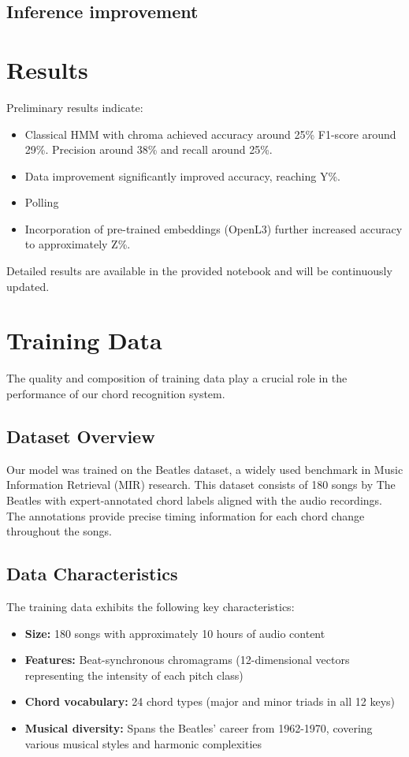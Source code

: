 \documentclass{article}
\begin{document}
\subsection{Inference improvement}


\section{Results}
Preliminary results indicate:
\begin{itemize}
    \item Classical HMM with chroma achieved accuracy around 25\% F1-score around 29\%. Precision around 38\% and recall around 25\%.
    \item Data improvement significantly improved accuracy, reaching Y\%.
    \item Polling
    \item Incorporation of pre-trained embeddings (OpenL3) further increased accuracy to approximately Z\%.
\end{itemize}
Detailed results are available in the provided notebook and will be continuously updated.

\section{Training Data}
\label{sec:training_data}

The quality and composition of training data play a crucial role in the performance of our chord recognition system.

\subsection{Dataset Overview}
Our model was trained on the Beatles dataset, a widely used benchmark in Music Information Retrieval (MIR) research. This dataset consists of 180 songs by The Beatles with expert-annotated chord labels aligned with the audio recordings. The annotations provide precise timing information for each chord change throughout the songs.

\subsection{Data Characteristics}
The training data exhibits the following key characteristics:
\begin{itemize}
    \item \textbf{Size:} 180 songs with approximately 10 hours of audio content
    \item \textbf{Features:} Beat-synchronous chromagrams (12-dimensional vectors representing 
      the intensity of each pitch class)
    \item \textbf{Chord vocabulary:} 24 chord types (major and minor triads in all 12 keys)
    \item \textbf{Musical diversity:} Spans the Beatles' career from 1962-1970, covering various 
      musical styles and harmonic complexities
\end{itemize}
\end{document}
